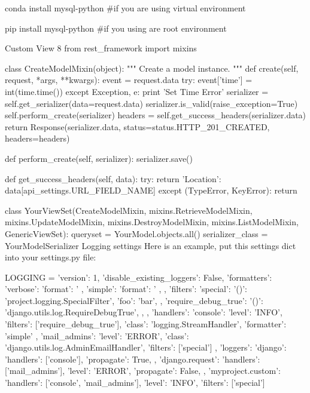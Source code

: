 conda install mysql-python #if you are using virtual environment

pip install mysql-python #if you using are root environment

Custom View 8
from rest_framework import mixins


class CreateModelMixin(object):
    """
    Create a model instance.
    """
    def create(self, request, *args, **kwargs):
        event = request.data
        try:
            event['time'] = int(time.time())
        except Exception, e:
            print 'Set Time Error'
        serializer = self.get_serializer(data=request.data)
        serializer.is_valid(raise_exception=True)
        self.perform_create(serializer)
        headers = self.get_success_headers(serializer.data)
        return Response(serializer.data, status=status.HTTP_201_CREATED, headers=headers)

    def perform_create(self, serializer):
        serializer.save()

    def get_success_headers(self, data):
        try:
            return {'Location': data[api_settings.URL_FIELD_NAME]}
        except (TypeError, KeyError):
            return {}

class YourViewSet(CreateModelMixin,
                  mixins.RetrieveModelMixin,
                  mixins.UpdateModelMixin,
                  mixins.DestroyModelMixin,
                  mixins.ListModelMixin,
                  GenericViewSet):
    queryset = YourModel.objects.all()
    serializer_class = YourModelSerializer
Logging settings
Here is an example, put this settings dict into your settings.py file:


LOGGING = {
    'version': 1,
    'disable_existing_loggers': False,
    'formatters': {
        'verbose': {
            'format': '%
        },
        'simple': {
            'format': '%
        },
    },
    'filters': {
        'special': {
            '()': 'project.logging.SpecialFilter',
            'foo': 'bar',
        },
        'require_debug_true': {
            '()': 'django.utils.log.RequireDebugTrue',
        },
    },
    'handlers': {
        'console': {
            'level': 'INFO',
            'filters': ['require_debug_true'],
            'class': 'logging.StreamHandler',
            'formatter': 'simple'
        },
        'mail_admins': {
            'level': 'ERROR',
            'class': 'django.utils.log.AdminEmailHandler',
            'filters': ['special']
        }
    },
    'loggers': {
        'django': {
            'handlers': ['console'],
            'propagate': True,
        },
        'django.request': {
            'handlers': ['mail_admins'],
            'level': 'ERROR',
            'propagate': False,
        },
        'myproject.custom': {
            'handlers': ['console', 'mail_admins'],
            'level': 'INFO',
            'filters': ['special']
        }
    }
}

